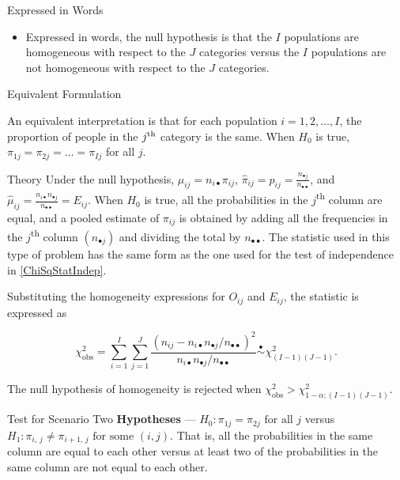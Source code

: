 \documentclass[
  ignorenonframetext,
]{beamer}
\providecommand{\tightlist}{%
  \setlength{\itemsep}{0pt}\setlength{\parskip}{0pt}}
\begin{document}
\begin{frame}{Expressed in Words}
\label{expressed-in-words}
\begin{itemize}
\tightlist
\item
  Expressed in words, the null hypothesis is that the \(I\) populations
  are homogeneous with respect to the \(J\) categories versus the \(I\)
  populations are not homogeneous with respect to the \(J\) categories.
\end{itemize}
\end{frame}

\begin{frame}{Equivalent Formulation}
\label{equivalent-formulation}
\begin{tcolorbox}
An equivalent interpretation is that for each population $i=1,2,\dots, I$, the
proportion of people in the $j\textsuperscript{th}$ category is the same.  When $H_0$ is
true, $\pi_{1j}=\pi_{2j}=\dots=\pi_{Ij}$ for all $j$.
\end{tcolorbox}
\end{frame}

\begin{frame}{Theory}
\label{theory}
Under the null hypothesis, \(\mu_{ij}= n_{i\bullet} \pi_{ij}\),
\(\hat\pi_{ij}=p_{ij}= \frac{n_{\bullet j}}{n_{\bullet\bullet}}\), and
\(\hat{\mu}_{ij}= \frac{n_{i\bullet} n_{\bullet j}}{n_{\bullet\bullet}}=E_{ij}\).
When \(H_0\) is true, all the probabilities in the
\(j\)\textsuperscript{th} column are equal, and a pooled estimate of
\(\pi_{ij}\) is obtained by adding all the frequencies in the
\(j\)\textsuperscript{th} column \((n_{\bullet j})\) and dividing the
total by \(n_{\bullet\bullet}\). The statistic used in this type of
problem has the same form as the one used for the test of independence
in \eqref{ChiSqStatIndep}.

Substituting the homogeneity expressions for \(O_{ij}\) and \(E_{ij}\),
the statistic is expressed as

\[\chi_{\text{obs}}^2=\sum_{i=1}^I\sum_{j=1}^J \frac{(n_{ij} - n_{i\bullet} n_{\bullet
j}/n_{\bullet\bullet})^2}{n_{i\bullet} n_{\bullet j}/n_{\bullet\bullet}} \overset{\bullet}{\sim}
\chi^2_{(I-1)(J-1)}.\]

The null hypothesis of homogeneity is rejected when
\(\chi_{\text{obs}}^2 > \chi^2_{1-\alpha; (I-1)(J-1)}\).
\end{frame}

\begin{frame}{Test for Scenario Two}
\label{test-for-scenario-two}
\textbf{Hypotheses} --- \(H_0: \pi_{1j}=\pi_{2j} \text{ for all } j\)
versus \(H_1: \pi_{i,\, j} \ne \pi_{i+1,\, j}\text{ for some }(i, j)\).
That is, all the probabilities in the same column are equal to each
other versus at least two of the probabilities in the same column are
not equal to each other.
\end{frame}
\end{document}

